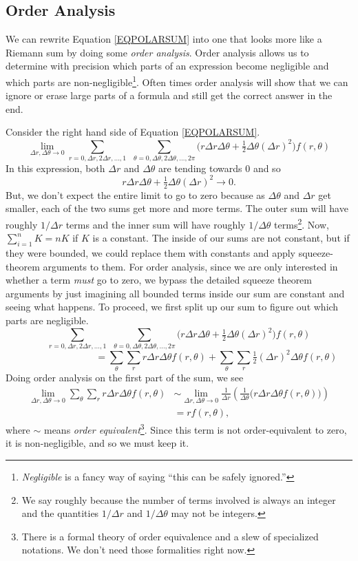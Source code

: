 \subsection{Order Analysis}
We can rewrite Equation \eqref{EQPOLARSUM} into one that looks more like a Riemann sum by
doing some \emph{order analysis}.  Order analysis allows us to determine
with precision
which parts of an expression become negligible and which parts are non-negligible\footnote{ \emph{Negligible}
is a fancy way of saying ``this can be safely ignored.''}.  Often
times order analysis will show that we can ignore or erase large parts of a formula and still
get the correct answer in the end.


Consider the right hand side of Equation \eqref{EQPOLARSUM}.
\[
	\lim_{\Delta r,\Delta \theta\to 0}
	\sum_{r=0,\Delta r,2\Delta r,\ldots,1}\ \ \sum_{\theta=0,\Delta\theta,
	2\Delta\theta, \ldots, 2\pi} \Big(
		r\Delta r\Delta \theta + \tfrac{1}{2}\Delta\theta(\Delta r)^2
	\Big)f(r,\theta)
\]
In this expression, both $\Delta r$
and $\Delta \theta$ are tending towards $0$ and so 
\[
	r\Delta r\Delta \theta + \tfrac{1}{2}\Delta\theta(\Delta r)^2\to 0.
\]
But, we don't expect the entire limit to go to zero because as $\Delta\theta$ and $\Delta r$
get smaller, each of the two sums get more and more terms.  The outer sum will have roughly
$1/\Delta r$ terms and the inner sum will have roughly $1/\Delta \theta$ terms\footnote{
We say roughly because the number of terms involved is always an integer and the quantities
$1/\Delta r$ and $1/\Delta \theta$ may not be integers.
}.  
Now, $\sum_{i=1}^n K=nK$ if $K$ is a constant.  The inside of our sums are not constant, but if
they were bounded, we could replace them with constants and apply squeeze-theorem arguments to them.
For order analysis, since we are only interested in whether a term
\emph{must} go to zero, we bypass the detailed squeeze theorem arguments 
by just imagining all bounded terms inside our sum are constant and seeing what happens.
To proceed, we first split up
our sum to figure out which parts are negligible.
\[
			\sum_{r=0,\Delta r,2\Delta r,\ldots,1}\ \ \sum_{\theta=0,\Delta\theta,
	2\Delta\theta, \ldots, 2\pi} \Big(
		r\Delta r\Delta \theta + \tfrac{1}{2}\Delta\theta(\Delta r)^2
		\Big)f(r,\theta)
\]
\[
	\phantom{MMMMMMMM}=\sum_{\theta}\sum_{r} r\Delta r\Delta \theta f(r,\theta)
	+ 
		\sum_{\theta}\sum_{r} \tfrac{1}{2}(\Delta r)^2\Delta \theta f(r,\theta)
\]
Doing order analysis on the first part of the sum, we see
\begin{align*}
	\lim_{\Delta r,\Delta\theta\to 0}
	\sum_{\theta}\sum_{r} r\Delta r\Delta \theta f(r,\theta)
	&\sim
	\lim_{\Delta r,\Delta\theta\to 0}
	\frac{1}{\Delta r}\left(\frac{1}{\Delta \theta} \Big(r\Delta r\Delta\theta f(r,\theta)\Big)\right)\\
	&=rf(r,\theta),
\end{align*}
where $\sim$ means \emph{order equivalent}\footnote{ There is a formal theory of
order equivalence and a slew of specialized notations.  We don't need those formalities
right now.}.  Since this term is not order-equivalent to zero, it is non-negligible, and so 
we must keep it.  

